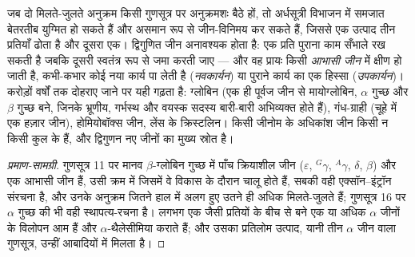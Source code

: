 \begin{proposition}[जीन द्विगुणन और जीन कुल]\label{prop:b2:genome-diversification:duplication}
जब दो मिलते-जुलते अनुक्रम किसी गुणसूत्र पर अनुक्रमशः बैठे हों, तो
अर्धसूत्री विभाजन में समजात बेतरतीब युग्मित हो सकते हैं और असमान रूप से
जीन-विनिमय कर सकते हैं, जिससे एक उत्पाद तीन प्रतियाँ ढोता है और दूसरा
एक। द्विगुणित जीन अनावश्यक होता है: एक प्रति पुराना काम सँभाले रख सकती
है जबकि दूसरी स्वतंत्र रूप से  जमा करती जाए --- और वह
प्रायः किसी \emph{आभासी जीन} में क्षीण हो जाती है, कभी-कभार कोई नया
कार्य पा लेती है (\emph{नवकार्यन}) या पुराने कार्य का एक हिस्सा
(\emph{उपकार्यन})। करोड़ों वर्षों तक दोहराए जाने पर यही
\emph{} गढ़ता है: ग्लोबिन (एक ही पूर्वज जीन से मायोग्लोबिन,
$\alpha$ गुच्छ और $\beta$ गुच्छ बने, जिनके भ्रूणीय, गर्भस्थ और वयस्क
सदस्य बारी-बारी अभिव्यक्त होते हैं), गंध-ग्राही (चूहे में एक हज़ार
जीन), होमियोबॉक्स जीन, लेंस के क्रिस्टलिन। किसी जीनोम के अधिकांश जीन
किसी न किसी कुल के हैं, और द्विगुणन नए जीनों का मुख्य स्रोत है।
\end{proposition}
\begin{proof}[प्रमाण-सामग्री]
गुणसूत्र 11 पर मानव $\beta$-ग्लोबिन गुच्छ में पाँच
क्रियाशील जीन ($\varepsilon$, $^{G}\gamma$, $^{A}\gamma$,
$\delta$, $\beta$) और एक आभासी जीन हैं, उसी क्रम में जिसमें वे विकास के
दौरान चालू होते हैं, सबकी वही एक्सॉन--इंट्रॉन संरचना है, और उनके अनुक्रम
जितने हाल में अलग हुए उतने ही अधिक मिलते-जुलते हैं; गुणसूत्र 16 पर
$\alpha$ गुच्छ की भी वही स्थापत्य-रचना है। लगभग एक जैसी प्रतियों के बीच
 से बने एक या अधिक $\alpha$ जीनों के विलोपन आम हैं
और $\alpha$-थैलेसीमिया कराते हैं; और उसका प्रतिलोम उत्पाद, यानी तीन
$\alpha$ जीन वाला गुणसूत्र, उन्हीं आबादियों में मिलता है।
\end{proof}

